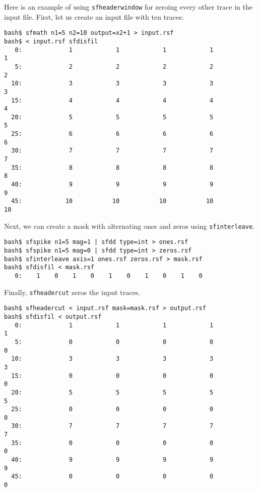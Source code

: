Here is an example of using \texttt{sfheaderwindow} for 
zeroing every other trace in the input file. First, let us create
an input file with ten traces:
\begin{verbatim}
bash$ sfmath n1=5 n2=10 output=x2+1 > input.rsf
bash$ < input.rsf sfdisfil
   0:             1            1            1            1            1
   5:             2            2            2            2            2
  10:             3            3            3            3            3
  15:             4            4            4            4            4
  20:             5            5            5            5            5
  25:             6            6            6            6            6
  30:             7            7            7            7            7
  35:             8            8            8            8            8
  40:             9            9            9            9            9
  45:            10           10           10           10           10
\end{verbatim}
Next, we can create a mask with alternating ones and zeros using
\texttt{sfinterleave}.
\begin{verbatim}
bash$ sfspike n1=5 mag=1 | sfdd type=int > ones.rsf
bash$ sfspike n1=5 mag=0 | sfdd type=int > zeros.rsf
bash$ sfinterleave axis=1 ones.rsf zeros.rsf > mask.rsf
bash$ sfdisfil < mask.rsf
   0:    1    0    1    0    1    0    1    0    1    0
\end{verbatim}
Finally, \texttt{sfheadercut} zeros the input traces.
\begin{verbatim}
bash$ sfheadercut < input.rsf mask=mask.rsf > output.rsf
bash$ sfdisfil < output.rsf 
   0:             1            1            1            1            1
   5:             0            0            0            0            0
  10:             3            3            3            3            3
  15:             0            0            0            0            0
  20:             5            5            5            5            5
  25:             0            0            0            0            0
  30:             7            7            7            7            7
  35:             0            0            0            0            0
  40:             9            9            9            9            9
  45:             0            0            0            0            0
\end{verbatim}

\noindent\doublebox{\parbox{\textwidth}{

}}

